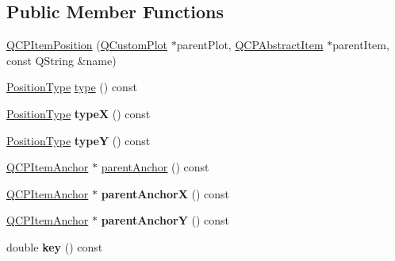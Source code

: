 \subsection*{Public Member Functions}
\begin{DoxyCompactItemize}
\item 
\mbox{\hyperlink{class_q_c_p_item_position_a6519a552bd9766354644ec24d1f26622}{Q\+C\+P\+Item\+Position}} (\mbox{\hyperlink{class_q_custom_plot}{Q\+Custom\+Plot}} $\ast$parent\+Plot, \mbox{\hyperlink{class_q_c_p_abstract_item}{Q\+C\+P\+Abstract\+Item}} $\ast$parent\+Item, const Q\+String \&name)
\item 
\mbox{\hyperlink{class_q_c_p_item_position_aad9936c22bf43e3d358552f6e86dbdc8}{Position\+Type}} \mbox{\hyperlink{class_q_c_p_item_position_abfd74d86bd799306ce0295ffe433bdfc}{type}} () const
\item 
\mbox{\label{class_q_c_p_item_position_a1415911868835701c04250566bfc681d}} 
\mbox{\hyperlink{class_q_c_p_item_position_aad9936c22bf43e3d358552f6e86dbdc8}{Position\+Type}} {\bfseries typeX} () const
\item 
\mbox{\label{class_q_c_p_item_position_ae47bac6f679c58f9e1c78dc63d56f331}} 
\mbox{\hyperlink{class_q_c_p_item_position_aad9936c22bf43e3d358552f6e86dbdc8}{Position\+Type}} {\bfseries typeY} () const
\item 
\mbox{\hyperlink{class_q_c_p_item_anchor}{Q\+C\+P\+Item\+Anchor}} $\ast$ \mbox{\hyperlink{class_q_c_p_item_position_a0a87f9dce1af6cc9b510785991bcf1c6}{parent\+Anchor}} () const
\item 
\mbox{\label{class_q_c_p_item_position_a605cb8b2cf6044d3d03cb1a894faf98a}} 
\mbox{\hyperlink{class_q_c_p_item_anchor}{Q\+C\+P\+Item\+Anchor}} $\ast$ {\bfseries parent\+AnchorX} () const
\item 
\mbox{\label{class_q_c_p_item_position_aa40afec791a4339b09572922ca425ec2}} 
\mbox{\hyperlink{class_q_c_p_item_anchor}{Q\+C\+P\+Item\+Anchor}} $\ast$ {\bfseries parent\+AnchorY} () const
\item 
\mbox{\label{class_q_c_p_item_position_a6fc519f1b73722a8d0cff7d4d647407e}} 
double {\bfseries key} () const
\item 
\mbox{\label{class_q_c_p_item_position_acfcf86f840a7366a4299bff593d5d636}} 

\end{DoxyCompactItemize}
